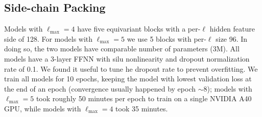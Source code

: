 \subsection{Side-chain Packing}
Models with $\ell_{\text{max}} = 4$ have five equivariant blocks with a per-$\ell$ hidden feature
side of 128. For models with $\ell_{\text{max}} = 5$ we use 5 blocks with per-$\ell$ size 96. In
doing so, the two models have comparable number of parameters (3M). All models have a 3-layer FFNN
with silu nonlinearity and dropout normalization rate of 0.1. We found it useful to tune he dropout
rate to prevent overfitting. We train all models for 10 epochs, keeping the model with lowest
validation loss at the end of an epoch (convergence usually happened by epoch $\sim$8); models with
$\ell_{\text{max}} = 5$ took roughly 50 minutes per epoch to train on a single NVIDIA A40 GPU,
while models with $\ell_{\text{max}} = 4$ took 35 minutes.